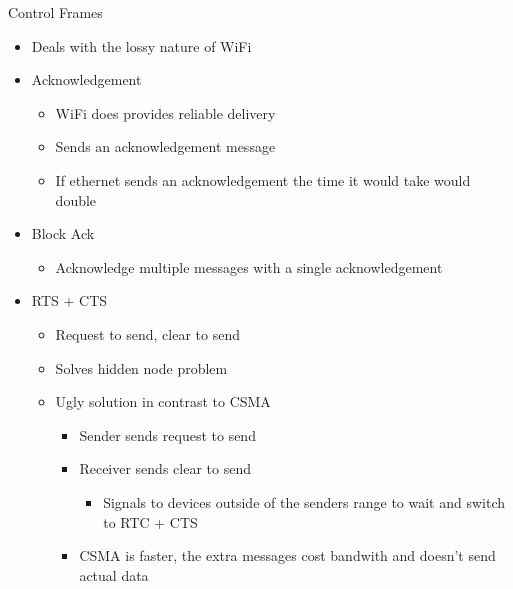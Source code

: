\documentclass{article}
\begin{document}
Control Frames
\begin{itemize}
    \item Deals with the lossy nature of WiFi
    \item Acknowledgement
    \begin{itemize}
        \item WiFi does provides reliable delivery 
        \item Sends an acknowledgement message
        \item If ethernet sends an acknowledgement the time it would take would double
    \end{itemize}
    \item Block Ack 
    \begin{itemize}
        \item Acknowledge multiple messages with a single acknowledgement
    \end{itemize}
    \item RTS + CTS 
    \begin{itemize}
        \item Request to send, clear to send
        \item Solves hidden node problem
        \item Ugly solution in contrast to CSMA
        \begin{itemize}
            \item Sender sends request to send 
            \item Receiver sends clear to send 
            \begin{itemize}
                \item Signals to devices outside of the senders range to wait and switch to RTC + CTS
            \end{itemize}
            \item CSMA is faster, the extra messages cost bandwith and doesn't send actual data 
        \end{itemize}
    \end{itemize}
\end{itemize}
\end{document}
